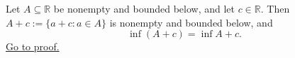 \begin{theorem}
\label{thm:translation-invariance-infimum}
Let $A\subseteq\mathbb{R}$ be nonempty and bounded below, and let
$c\in\mathbb{R}$.  Then $A+c:=\{a+c:a\in A\}$ is nonempty and bounded below,
and
\[
  \inf(A+c)=\inf A+c.
\]
\hyperref[prf:translation-invariance-infimum]{Go to proof.}
\end{theorem}